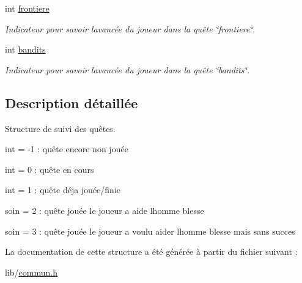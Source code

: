 \begin{DoxyCompactItemize}
int \hyperlink{structquete__t_aa868cfb9c0666dedb9ba8626a08b9286}{frontiere}
\begin{DoxyCompactList}\small\item\em Indicateur pour savoir l\textquotesingle{}avancée du joueur dans la quête \char`\"{}frontiere\char`\"{}. \end{DoxyCompactList}\item 
\mbox{\label{structquete__t_a234d64b7cb00513bcdb48456235f88bc}} 
int \hyperlink{structquete__t_a234d64b7cb00513bcdb48456235f88bc}{bandits}
\begin{DoxyCompactList}\small\item\em Indicateur pour savoir l\textquotesingle{}avancée du joueur dans la quête \char`\"{}bandits\char`\"{}. \end{DoxyCompactList}\end{DoxyCompactItemize}


\subsection{Description détaillée}
Structure de suivi des quêtes. 


\begin{DoxyItemize}
\item int = -\/1 \+: quête encore non jouée
\item int = 0 \+: quête en cours
\item int = 1 \+: quête déja jouée/finie
\item soin = 2 \+: quête jouée le joueur a aide l\textquotesingle{}homme blesse
\item soin = 3 \+: quête jouée le joueur a voulu aider l\textquotesingle{}homme blesse mais sans succes 
\end{DoxyItemize}

La documentation de cette structure a été générée à partir du fichier suivant \+:\begin{DoxyCompactItemize}
\item 
lib/\hyperlink{commun_8h}{commun.\+h}\end{DoxyCompactItemize}
